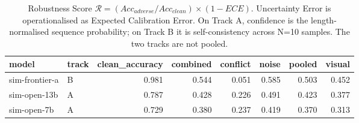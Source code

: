 \begin{table}[t]
\centering
\small
\begin{tabular}{llrrrrrr}
\toprule
model & track & clean\_accuracy & combined & conflict & noise & pooled & visual \\
\midrule
sim-frontier-a & B & 0.981 & 0.544 & 0.051 & 0.585 & 0.503 & 0.452 \\
sim-open-13b & A & 0.787 & 0.428 & 0.226 & 0.491 & 0.423 & 0.377 \\
sim-open-7b & A & 0.729 & 0.380 & 0.237 & 0.419 & 0.370 & 0.313 \\
\bottomrule
\end{tabular}
\caption{Robustness Score $\mathcal{R} = (Acc_{adverse}/Acc_{clean})\times(1-ECE)$. Uncertainty Error is operationalised as Expected Calibration Error. On Track A, confidence is the length-normalised sequence probability; on Track B it is self-consistency across N=10 samples. The two tracks are not pooled.}
\end{table}
